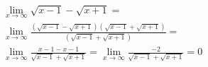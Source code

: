\begin{ex}
\begin{align}
&\lim_{x\rightarrow \infty} \sqrt{x-1}-\sqrt{x+1}=\nonumber\\
&\lim_{x\rightarrow \infty} \frac{(\sqrt{x-1}-\sqrt{x+1})(\sqrt{x-1}+\sqrt{x+1})}{(\sqrt{x-1}+\sqrt{x+1})}=\nonumber\\
&\lim_{x\rightarrow \infty} \frac{x-1-x-1}{\sqrt{x-1}+\sqrt{x+1}}=\lim_{x\rightarrow \infty} \frac{-2}{\sqrt{x-1}+\sqrt{x+1}}=0\nonumber
\end{align}
\end{ex}